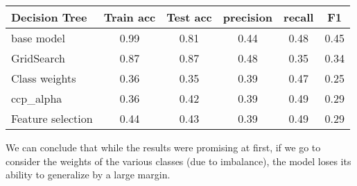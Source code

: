 \begin{table}[H]
\centering
\footnotesize
\begin{tabular}{|l|c|c|c|c|c|}
\hline
\rowcolor[HTML]{036400} 
{\color[HTML]{FFFFFF} Decision Tree}      & {\color[HTML]{FFFFFF} Train acc} & {\color[HTML]{FFFFFF} Test acc} & {\color[HTML]{FFFFFF} precision} & {\color[HTML]{FFFFFF} recall} & {\color[HTML]{FFFFFF} F1} \\ \hline
\cellcolor[HTML]{C0C0C0}base model        & 0.99                             & 0.81                            & 0.44                             & 0.48                          & 0.45                      \\ \hline
\cellcolor[HTML]{C0C0C0}GridSearch        & 0.87                             & 0.87                            & 0.48                             & 0.35                          & 0.34                      \\ \hline
\cellcolor[HTML]{C0C0C0}Class weights     & 0.36                             & 0.35                            & 0.39                             & 0.47                          & 0.25                      \\ \hline
\cellcolor[HTML]{C0C0C0}ccp\_alpha        & 0.36                             & 0.42                            & 0.39                             & 0.49                          & 0.29                      \\ \hline
\cellcolor[HTML]{C0C0C0}Feature selection & 0.44                             & 0.43                            & 0.39                             & 0.49                          & 0.29                      \\ \hline
\end{tabular}
\end{table}
\noindent We can conclude that while the results were promising at first, if we go to consider the weights of the various classes (due to imbalance), the model loses its ability to generalize by a large margin.
